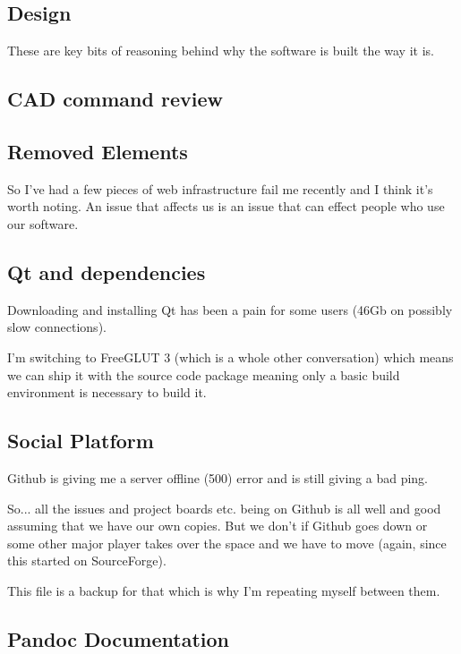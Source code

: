 \documentclass[a4paper]{report}
\begin{document}
\subsection{Design}

These are key bits of reasoning behind why the software is built the way it is.

\subsection{CAD command review}



\subsection{Removed Elements}

So I've had a few pieces of web infrastructure fail me recently and
I think it's worth noting. An issue that affects us is an issue that
can effect people who use our software.

\subsection{Qt and dependencies}

Downloading and installing Qt has been a pain for some users
(46Gb on possibly slow connections).

I'm switching to FreeGLUT 3 (which is a whole other conversation) which means we
can ship it with the source code package meaning only a basic build
environment is necessary to build it.

\subsection{Social Platform}

Github is giving me a server offline (500) error and is still giving a bad ping.

So... all the issues and project boards etc. being on Github is all well and good assuming that we have our own copies. But we don't if Github goes down or some other major player takes over the space and we have to move (again, since this started on SourceForge).

This file is a backup for that which is why I'm repeating myself between them.

\subsection{Pandoc Documentation}
\end{document}
